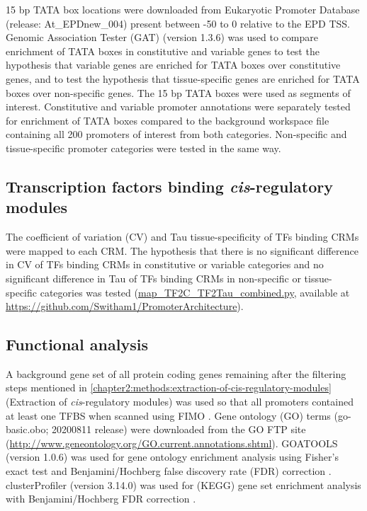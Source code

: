 \documentclass[../main.tex]{subfiles}
\begin{document}
15 bp TATA box locations were downloaded from Eukaryotic Promoter Database (release: At\_EPDnew\_004) \autocite{dreosEukaryoticPromoterDatabase2017} present between -50 to 0 relative to the EPD TSS.
Genomic Association Tester (GAT) \autocite{hegerGATSimulationFramework2013} (version 1.3.6) was used to
compare enrichment of TATA boxes in constitutive and variable genes to test the hypothesis that variable genes are enriched for TATA boxes over constitutive genes, and to test the hypothesis that tissue\hyp{}specific genes are enriched for TATA boxes over non\hyp{}specific genes.
The 15 bp TATA boxes were used as segments of interest.
Constitutive and variable promoter annotations were separately tested for enrichment of TATA boxes compared to the background workspace file containing all 200 promoters of interest from both categories.
Non\hyp{}specific and tissue\hyp{}specific promoter categories were tested in the same way.

\subsection{Transcription factors binding \textit{cis}\hyp{}regulatory modules}\label{chapter2:methods:tfs-binding-crms}

The coefficient of variation (CV) and Tau tissue\hyp{}specificity of TFs binding CRMs were mapped to each CRM.
The hypothesis that there is no significant difference in CV of TFs binding CRMs in constitutive or variable categories and no significant difference in Tau of TFs binding CRMs in non\hyp{}specific or tissue\hyp{}specific categories was tested (\href{https://github.com/Switham1/PromoterArchitecture/blob/master/src/plotting/map_TF2CV_TF2Tau_combined.py}{map\_TF2C\_TF2Tau\_combined.py}, available at \url{https://github.com/Switham1/PromoterArchitecture}).

\subsection{Functional analysis}\label{chapter2:methods:functional-analysis}

A background gene set of all protein coding genes remaining after the filtering steps mentioned in \autoref{chapter2:methods:extraction-of-cis-regulatory-modules} (Extraction of \textit{cis}\hyp{}regulatory modules) was used so that all promoters contained at least one TFBS when scanned using FIMO \autocite{grantFIMOScanningOccurrences2011}.
Gene ontology (GO) terms (go-basic.obo; 2020\textendash{}08\textendash{}11 release) were downloaded from the GO FTP site (\url{http://www.geneontology.org/GO.current.annotations.shtml}).
GOATOOLS \autocite{klopfensteinGOATOOLSPythonLibrary2018} (version 1.0.6) was used for gene ontology enrichment analysis using Fisher's exact test \autocite{fisherInterpretationContingencyTables1922} and Benjamini/Hochberg false discovery rate (FDR) correction \autocite{benjaminiControllingFalseDiscovery1995}.
clusterProfiler \autocite{yuClusterProfilerPackageComparing2012} (version 3.14.0) was used for (KEGG) gene set enrichment analysis \autocite{kanehisaKEGGKyotoEncyclopedia2000} with Benjamini/Hochberg FDR correction \autocite{benjaminiControllingFalseDiscovery1995}.
\end{document}

